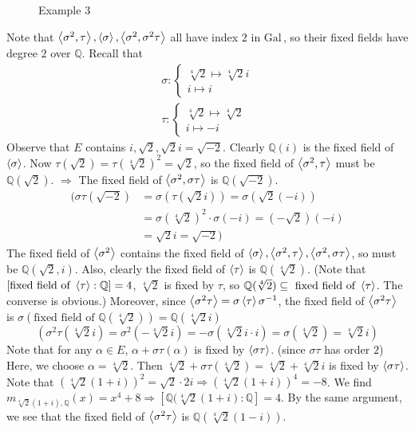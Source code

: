 \documentclass{article}
\theoremstyle{definition}
\newcommand{\QQ}{\mathbb Q}
\newcommand{\Ra}{\Rightarrow}
\newcommand{\Gal}{\text{Gal}\,}
\begin{document}
\begin{enumerate}
\begin{figure}[H]
\begin{tikzpicture}
						\end{tikzpicture}
					\caption{Example 3}
				\end{figure}

		Note that $\ev{\sigma^2, \tau}, \ev{\sigma}, \ev{\sigma^2, \sigma^2 \tau}$ all have index $2$ in $\Gal$, so their fixed fields have degree $2$ over $\QQ$.
		Recall that 
		\[
			\begin{split}
				\sigma: 
				\begin{cases}
					\sqrt[4]{2} \mapsto \sqrt[4]{2} i\\
					i \mapsto i
				\end{cases}
				\\
				\tau:
				\begin{cases}
					\sqrt[4]{2} \mapsto \sqrt[4]{2}\\
					i \mapsto -i
				\end{cases}
			\end{split}
		\]
		Observe that $E$ contains $i, \sqrt{2}, \sqrt{2} i = \sqrt{-2}$.
		Clearly $\QQ(i)$ is the fixed field of $\ev{\sigma}$.
		Now $\tau(\sqrt{2}) = \tau(\sqrt[4]{2})^2 = \sqrt{2}$, so the fixed field of $\ev{\sigma^2, \tau}$ must be $\QQ(\sqrt{2})$.
		$\Ra$ The fixed field of $\ev{\sigma^2, \sigma \tau}$ is $\QQ(\sqrt{-2})$.
		\[
			\begin{split}
				(\sigma \tau(\sqrt{-2}) &= \sigma(\tau(\sqrt{2} i)) = \sigma(\sqrt{2} (-i))\\
				&= \sigma(\sqrt[4]{2})^2 \cdot \sigma(-i) = (-\sqrt{2}) (-i)\\
				&= \sqrt{2} i = \sqrt{-2})
			\end{split}
		\]
		The fixed field of $\ev{\sigma^2}$ contains the fixed field of $\ev{\sigma}, \ev{\sigma^2, \tau}, \ev{\sigma^2, \sigma \tau}$, so must be $\QQ(\sqrt{2}, i)$.
		Also, clearly the fixed field of $\ev{\tau}$ is $\QQ(\sqrt[4]{2})$.
		(Note that $[\text{fixed field of }\ev{\tau}:\QQ] = 4$, $\sqrt[4]{2}$ is fixed by $\tau$, so $\QQ(\sqrt[4]{2}) \subseteq \text{ fixed field of }\ev{\tau}$. The converse is obvious.)
		Moreover, since $\ev{\sigma^2 \tau} = \sigma \ev{\tau} \sigma^{-1}$, the fixed field of $\ev{\sigma^2 \tau}$ is $\sigma(\text{fixed field of }\QQ(\sqrt[4]{2})) = \QQ(\sqrt[4]{2} i)$
		\[
			(\sigma^2 \tau(\sqrt[4]{2} i) = \sigma^2 (- \sqrt[4]{2} i) = -\sigma (\sqrt[4]{2} i \cdot i) = \sigma(\sqrt[4]{2}) = \sqrt[4]{2} i)
		\]
		Note that for any $\alpha \in E$, $\alpha + \sigma \tau(\alpha)$ is fixed by $\ev{\sigma \tau}$. (since $\sigma \tau$ has order $2$)
		Here, we choose $\alpha = \sqrt[4]{2}$.
		Then $\sqrt[4]{2} + \sigma \tau(\sqrt[4]{2}) = \sqrt[4]{2} + \sqrt[4]{2} i$ is fixed by $\ev{\sigma \tau}$.
		Note that $(\sqrt[4]{2}(1 + i))^2 = \sqrt{2} \cdot 2 i \Ra (\sqrt[4]{2}(1 + i))^4 = -8$.
		We find $m_{\sqrt[4]{2}(1 + i), \QQ}(x) =  x^4 + 8 \Ra [\QQ(\sqrt[4]{2}(1 + i) : \QQ] = 4$.
		By the same argument, we see that the fixed field of $\ev{\sigma^2 \tau}$ is $\QQ(\sqrt[4]{2}(1 - i))$.
	

\end{enumerate}
\end{document}
